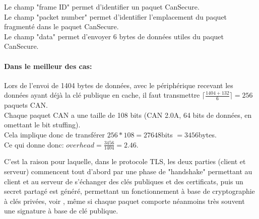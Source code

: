 Le champ "frame ID" permet d'identifier un paquet CanSecure.\\
Le champ "packet number" permet d'identifier l'emplacement du paquet fragmenté dans le paquet CanSecure.\\
Le champ "data" permet d'envoyer 6 bytes de données utiles du paquet CanSecure.

\FloatBarrier

\paragraph{Dans le meilleur des cas:}
Lors de l'envoi de 1404 bytes de données, avec le périphérique recevant les données ayant déjà la clé publique en cache, il faut transmettre $\lceil\frac{1404+132}{6}\rceil=256$ paquets CAN.\\
Chaque paquet CAN a une taille de 108 bits (CAN 2.0A, 64 bits de données, en omettant le bit stuffing).\\
Cela implique donc de transférer $256*108 = 27648$bits $= 3456$bytes.\\
Ce qui donne donc: $overhead = \frac{3456}{1404} = 2.46$.


C'est la raison pour laquelle, dans le protocole TLS, les deux parties (client et serveur) commencent tout d'abord par une phase de "handshake" permettant au client et au serveur de s'échanger des clés publiques et des certificats, puis un secret partagé est généré, permettant un fonctionnement à base de cryptographie à clés privées, voir \cite{rfc5246}, même si chaque paquet comporte néanmoins très souvent une signature à base de clé publique.
